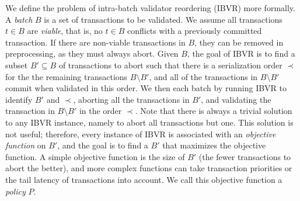 We define the problem of intra-batch validator reordering (IBVR) more formally. A \emph{batch} $B$ is a set of transactions to be validated. We assume all transactions $t \in B$ are \emph{viable}, that is, no $t \in B$ conflicts with a previously committed transaction. If there are non-viable transactions in $B$, they can be removed in preprocessing, as they must always abort.
Given $B$, the goal of IBVR is to find a subset $B' \subseteq B$ of transactions to abort such that there is a serialization order $\prec$ for the 
the remaining transactions $B \setminus B'$, and all of the transactions in $B \setminus B'$ commit when validated in this order.
We then  each batch by running IBVR to identify $B'$ and $\prec$, aborting all the transactions in $B'$,  and validating the transaction in $B \setminus B'$  
in the order $\prec$. 
Note that there is always a trivial solution to any IBVR instance, namely to abort all transactions but one. 
This solution is not useful; therefore, every instance of
IBVR is associated with an \emph{objective function} on $B'$, and the goal is to
find a $B'$ that maximizes the objective function. A simple objective function
is the size of $B'$ (the fewer transactions to abort the better), and more complex functions can take transaction priorities
or the tail latency of transactions into
account. We call this objective function a \emph{policy} $P$.

